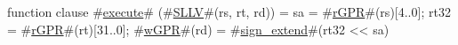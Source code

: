 function clause #\hyperref[zexecute]{execute}# (#\hyperref[zSLLV]{SLLV}#(rs, rt, rd)) =
  {
    sa       = #\hyperref[zrGPR]{rGPR}#(rs)[4..0];
    rt32     = #\hyperref[zrGPR]{rGPR}#(rt)[31..0];
    #\hyperref[zwGPR]{wGPR}#(rd) = #\hyperref[zsignzyextend]{sign\_extend}#(rt32 << sa)
  }

